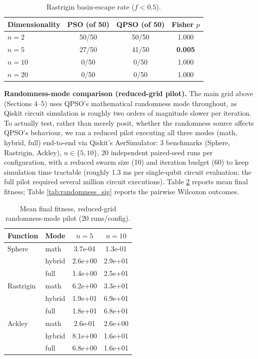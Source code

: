 \documentclass[11pt]{article}
\begin{document}
\begin{table}[h]
\centering
\small
\vspace{-0.3em}
\begin{tabular}{lccc}
\toprule
Dimensionality & PSO (of 50) & QPSO (of 50) & Fisher $p$ \\
\midrule
$n=2$ & 50/50 & 50/50 & 1.000 \\
$n=5$ & 27/50 & 41/50 & \textbf{0.005} \\
$n=10$ & 0/50 & 0/50 & 1.000 \\
$n=20$ & 0/50 & 0/50 & 1.000 \\
\bottomrule
\end{tabular}
\caption{Rastrigin basin-escape rate ($f<0.5$).}
\label{tab:escape}
\vspace{-0.5em}
\end{table}

\textbf{Randomness-mode comparison (reduced-grid pilot).} The main grid above (Sections 4--5) uses QPSO's mathematical randomness mode throughout, as Qiskit circuit simulation is roughly two orders of magnitude slower per iteration. To actually test, rather than merely posit, whether the randomness source affects QPSO's behaviour, we ran a reduced pilot executing all three modes (math, hybrid, full) end-to-end via Qiskit's AerSimulator: 3 benchmarks (Sphere, Rastrigin, Ackley), $n\in\{5,10\}$, 20 independent paired-seed runs per configuration, with a reduced swarm size (10) and iteration budget (60) to keep simulation time tractable (roughly 1.3 ms per single-qubit circuit evaluation; the full pilot required several million circuit executions). Table \ref{tab:randomness} reports mean final fitness; Table \ref{tab:randomness_sig} reports the pairwise Wilcoxon outcomes.

\begin{table}[h]
\centering
\scriptsize
\begin{tabular}{llcc}
\toprule
Function & Mode & $n=5$ & $n=10$ \\
\midrule
Sphere & math & 3.7e-04 & 1.3e-01 \\
 & hybrid & 2.6e+00 & 2.9e+01 \\
 & full & 1.4e+00 & 2.5e+01 \\
Rastrigin & math & 6.2e+00 & 3.3e+01 \\
 & hybrid & 1.9e+01 & 6.9e+01 \\
 & full & 1.8e+01 & 6.8e+01 \\
Ackley & math & 2.6e-01 & 2.6e+00 \\
 & hybrid & 8.1e+00 & 1.6e+01 \\
 & full & 6.8e+00 & 1.6e+01 \\
\bottomrule
\end{tabular}
\caption{Mean final fitness, reduced-grid randomness-mode pilot (20 runs/config).}
\label{tab:randomness}
\end{table}
\end{document}
